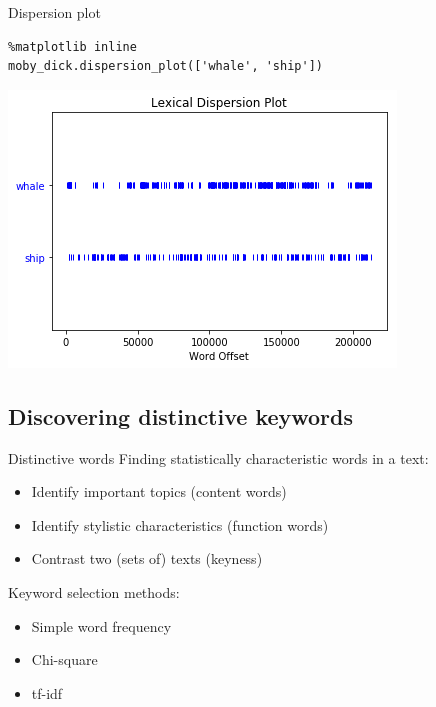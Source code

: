 \documentclass[aspectratio=169,usenames,dvipsnames]{beamer}
\begin{document}
\begin{frame}[fragile]{Dispersion plot}
\begin{lstlisting}
%matplotlib inline
moby_dick.dispersion_plot(['whale', 'ship'])
\end{lstlisting}

    \centering
    \includegraphics[height=0.6\textheight]{fig/dispersion}
\end{frame}

\subsection{Discovering distinctive keywords}
\begin{frame}{Distinctive words}
    Finding statistically characteristic words in a text:
    \begin{itemize}
        \item Identify important topics (content words)
        \item Identify stylistic characteristics (function words)
        \item Contrast two (sets of) texts (keyness)
    \end{itemize}

    Keyword selection methods:
    \begin{itemize}
        \item Simple word frequency
        \item Chi-square
        \item tf-idf
    \end{itemize}

\end{frame}
\end{document}
